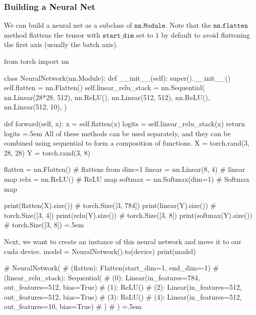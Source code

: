 \documentclass{article}
\newenvironment{cverbatim}
 {\SaveVerbatim{cverb}}
 {\endSaveVerbatim
  \flushleft\fboxrule=0pt\fboxsep=.5em
  \colorbox{cverbbg}{%
    \makebox[\dimexpr\linewidth-2\fboxsep][l]{\BUseVerbatim{cverb}}%
  }
  \endflushleft
}
\theoremstyle{definition}
\theoremstyle{remark}
\theoremstyle{definition}
\begin{document}
\subsubsection{Building a Neural Net}

We can build a neural net as a subclass of $\texttt{nn.Module}$. Note that the $\texttt{nn.flatten}$ method flattens the tensor with $\texttt{start\_dim}$ set to $1$ by default to avoid flattening the first axis (usually the batch axis). 

\begin{cverbatim}
from torch import nn

class NeuralNetwork(nn.Module):
    def __init__(self):
        super().__init__()
        self.flatten = nn.Flatten()
        self.linear_relu_stack = nn.Sequential(
            nn.Linear(28*28, 512),
            nn.ReLU(),
            nn.Linear(512, 512),
            nn.ReLU(),
            nn.Linear(512, 10),
        )

    def forward(self, x):
        x = self.flatten(x)
        logits = self.linear_relu_stack(x)
        return logits
\end{cverbatim}
All of these methods can be used separately, and they can be combined using sequential to form a composition of functions. 
\begin{cverbatim}
X = torch.rand(3, 28, 28)
Y = torch.rand(3, 8)

flatten = nn.Flatten()      # flattens from dim=1 
linear = nn.Linear(8, 4)    # linear map 
relu = nn.ReLU()            # ReLU map 
softmax = nn.Softmax(dim=1) # Softmax map 

print(flatten(X).size())    # torch.Size([3, 784])
print(linear(Y).size())     # torch.Size([3, 4])
print(relu(Y).size())       # torch.Size([3, 8])
print(softmax(Y).size())    # torch.Size([3, 8])
\end{cverbatim}

Next, we want to create an instance of this neural network and move it to our cuda device. 
\begin{cverbatim}
model = NeuralNetwork().to(device)
print(model)

# NeuralNetwork(
#   (flatten): Flatten(start_dim=1, end_dim=-1)
#   (linear_relu_stack): Sequential(
#     (0): Linear(in_features=784, out_features=512, bias=True)
#     (1): ReLU()
#     (2): Linear(in_features=512, out_features=512, bias=True)
#     (3): ReLU()
#     (4): Linear(in_features=512, out_features=10, bias=True)
#   )
# )
\end{cverbatim}
\end{document}

